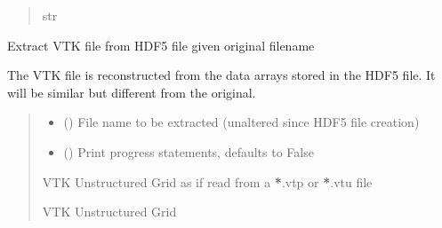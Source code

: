 \documentclass[letterpaper,10pt,english]{sphinxmanual}
\begin{document}
\begin{fulllineitems}
\begin{fulllineitems}
\begin{quote}
\begin{description}
\sphinxAtStartPar
str

\end{description}\end{quote}

\end{fulllineitems}


\begin{fulllineitems}
\label{\detokenize{openfdem:openfdem.aggregate_storage.aggregate_storage.read_file}}
\pysigstartsignatures
{}
\pysigstopsignatures
\sphinxAtStartPar
Extract VTK file from HDF5 file given original filename

\sphinxAtStartPar
The VTK file is reconstructed from the data arrays stored in the HDF5 file. It will be similar but different from the original.
\begin{quote}\begin{description}
\begin{itemize}
\item {} 
\sphinxAtStartPar
{} () \textendash{} File name to be extracted (unaltered since HDF5 file creation)

\item {} 
\sphinxAtStartPar
{} (\sphinxstyleliteralemphasis{\sphinxupquote{, }}) \textendash{} Print progress statements, defaults to False

\end{itemize}

\sphinxAtStartPar
VTK Unstructured Grid as if read from a {\color{red}\bfseries{}*}.vtp or {\color{red}\bfseries{}*}.vtu file

\sphinxAtStartPar
VTK Unstructured Grid

\end{description}\end{quote}

\end{fulllineitems}


\end{fulllineitems}
\end{document}
